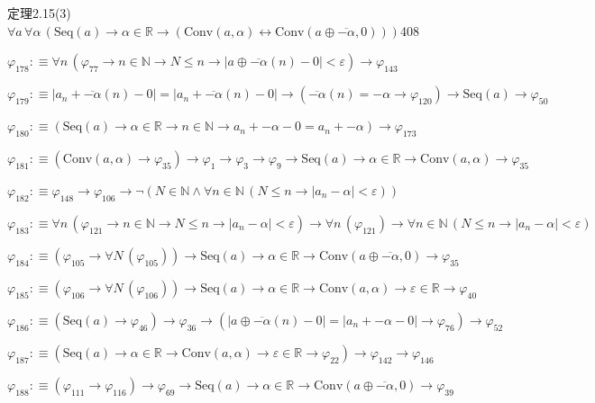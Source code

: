 \begin{fullproof}{定理2.15(3)}{$\forall a\,\forall \alpha\,(\mathrm{Seq}(a) \to \alpha \in \mathbb{R} \to (\mathrm{Conv}(a,\alpha) \leftrightarrow \mathrm{Conv}(a \oplus \overline{-\alpha},0)))$}{408}
\begin{abbrevlist}
\item $\varphi_{178} :\equiv \forall n\,(\varphi_{77} \to n \in \mathbb{N} \to N \leq n \to \lvert a \oplus \overline{-\alpha}(n) - 0 \rvert < \varepsilon) \to \varphi_{143}$
\item $\varphi_{179} :\equiv \lvert a_{n} + \overline{-\alpha}(n) - 0 \rvert = \lvert a_{n} + \overline{-\alpha}(n) - 0 \rvert \to (\overline{-\alpha}(n) = -\alpha \to \varphi_{120}) \to \mathrm{Seq}(a) \to \varphi_{50}$
\item $\varphi_{180} :\equiv (\mathrm{Seq}(a) \to \alpha \in \mathbb{R} \to n \in \mathbb{N} \to a_{n} + -\alpha - 0 = a_{n} + -\alpha) \to \varphi_{173}$
\item $\varphi_{181} :\equiv (\mathrm{Conv}(a,\alpha) \to \varphi_{35}) \to \varphi_{1} \to \varphi_{3} \to \varphi_{9} \to \mathrm{Seq}(a) \to \alpha \in \mathbb{R} \to \mathrm{Conv}(a,\alpha) \to \varphi_{35}$
\item $\varphi_{182} :\equiv \varphi_{148} \to \varphi_{106} \to \neg (N \in \mathbb{N} \land \forall n \in \mathbb{N}\,(N \leq n \to \lvert a_{n} - \alpha \rvert < \varepsilon))$
\item $\varphi_{183} :\equiv \forall n\,(\varphi_{121} \to n \in \mathbb{N} \to N \leq n \to \lvert a_{n} - \alpha \rvert < \varepsilon) \to \forall n\,(\varphi_{121}) \to \forall n \in \mathbb{N}\,(N \leq n \to \lvert a_{n} - \alpha \rvert < \varepsilon)$
\item $\varphi_{184} :\equiv (\varphi_{105} \to \forall N\,(\varphi_{105})) \to \mathrm{Seq}(a) \to \alpha \in \mathbb{R} \to \mathrm{Conv}(a \oplus \overline{-\alpha},0) \to \varphi_{35}$
\item $\varphi_{185} :\equiv (\varphi_{106} \to \forall N\,(\varphi_{106})) \to \mathrm{Seq}(a) \to \alpha \in \mathbb{R} \to \mathrm{Conv}(a,\alpha) \to \varepsilon \in \mathbb{R} \to \varphi_{40}$
\item $\varphi_{186} :\equiv (\mathrm{Seq}(a) \to \varphi_{46}) \to \varphi_{36} \to (\lvert a \oplus \overline{-\alpha}(n) - 0 \rvert = \lvert a_{n} + -\alpha - 0 \rvert \to \varphi_{76}) \to \varphi_{52}$
\item $\varphi_{187} :\equiv (\mathrm{Seq}(a) \to \alpha \in \mathbb{R} \to \mathrm{Conv}(a,\alpha) \to \varepsilon \in \mathbb{R} \to \varphi_{22}) \to \varphi_{142} \to \varphi_{146}$
\item $\varphi_{188} :\equiv (\varphi_{111} \to \varphi_{116}) \to \varphi_{69} \to \mathrm{Seq}(a) \to \alpha \in \mathbb{R} \to \mathrm{Conv}(a \oplus \overline{-\alpha},0) \to \varphi_{39}$

\end{abbrevlist}
\end{fullproof}
